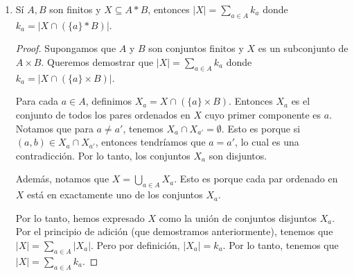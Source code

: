 \documentclass{article}
\begin{document}
\begin{enumerate}
\begin{proof}
      Por lo tanto, el número total de funciones inyectivas $f : Y \rightarrow X$ es $n \cdot (n - 1) \cdot \ldots \cdot (n - k + 1)$.
    \end{proof}

  \item Sí $A,B$ son finitos y $ X \subseteq A * B$, entonces $|X| = \sum_{a \in A}k_a$ donde $k_a = |X \cap (\{a\}*B)|$.
    \begin{proof}
      Supongamos que $A$ y $B$ son conjuntos finitos y $X$ es un subconjunto de $A \times B$. Queremos demostrar que $|X| = \sum_{a \in A} k_a$ donde $k_a = |X \cap (\{a\} \times B)|$.

      Para cada $a \in A$, definimos $X_a = X \cap (\{a\} \times B)$. Entonces $X_a$ es el conjunto de todos los pares ordenados en $X$ cuyo primer componente es $a$. Notamos que para $a \neq a'$, tenemos $X_a \cap X_{a'} = \emptyset$. Esto es porque si $(a, b) \in X_a \cap X_{a'}$, entonces tendríamos que $a = a'$, lo cual es una contradicción. Por lo tanto, los conjuntos $X_a$ son disjuntos.

      Además, notamos que $X = \bigcup_{a \in A} X_a$. Esto es porque cada par ordenado en $X$ está en exactamente uno de los conjuntos $X_a$.

      Por lo tanto, hemos expresado $X$ como la unión de conjuntos disjuntos $X_a$. Por el principio de adición (que demostramos anteriormente), tenemos que $|X| = \sum_{a \in A} |X_a|$. Pero por definición, $|X_a| = k_a$. Por lo tanto, tenemos que $|X| = \sum_{a \in A} k_a$.
    \end{proof}
\end{enumerate}
\end{document}

